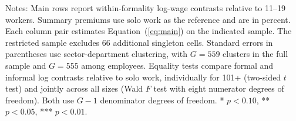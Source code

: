 \begin{table}[!htbp]
\begin{tabular}{lrrrr}
    \bottomrule
  \end{tabular}
  \vspace{0.3em}
  \begin{minipage}{0.95\textwidth}
  \footnotesize
  Notes: Main rows report within-formality log-wage contrasts relative to 11--19 workers. Summary premiums use solo work as the reference and are in percent. Each column pair estimates Equation~(\ref{eq:main}) on the indicated sample. The restricted sample excludes 66 additional singleton cells. Standard errors in parentheses use sector-department clustering, with $G=559$ clusters in the full sample and $G=555$ among employees. Equality tests compare formal and informal log contrasts relative to solo work, individually for 101+ (two-sided $t$ test) and jointly across all sizes (Wald $F$ test with eight numerator degrees of freedom). Both use $G-1$ denominator degrees of freedom. * $p<0.10$, ** $p<0.05$, *** $p<0.01$.
  \end{minipage}
\end{table}
